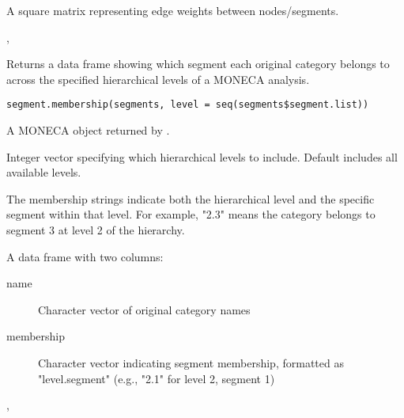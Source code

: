 \documentclass[a4paper]{book}
\begin{document}
%
\begin{Value}
A square matrix representing edge weights between nodes/segments.
\end{Value}
%
\begin{SeeAlso}
, 
\end{SeeAlso}
%
\begin{Description}
Returns a data frame showing which segment each original category belongs to
across the specified hierarchical levels of a MONECA analysis.
\end{Description}
%
\begin{Usage}
\begin{verbatim}
segment.membership(segments, level = seq(segments$segment.list))
\end{verbatim}
\end{Usage}
%
\begin{Arguments}
\begin{ldescription}
\item[\code{segments}] A MONECA object returned by .

\item[\code{level}] Integer vector specifying which hierarchical levels to include.
Default includes all available levels.
\end{ldescription}
\end{Arguments}
%
\begin{Details}
The membership strings indicate both the hierarchical level and the specific
segment within that level. For example, "2.3" means the category belongs to
segment 3 at level 2 of the hierarchy.
\end{Details}
%
\begin{Value}
A data frame with two columns:
\begin{description}

\item[name] Character vector of original category names
\item[membership] Character vector indicating segment membership, formatted
as "level.segment" (e.g., "2.1" for level 2, segment 1)

\end{description}

\end{Value}
%
\begin{SeeAlso}
, 
\end{SeeAlso}
\end{document}
